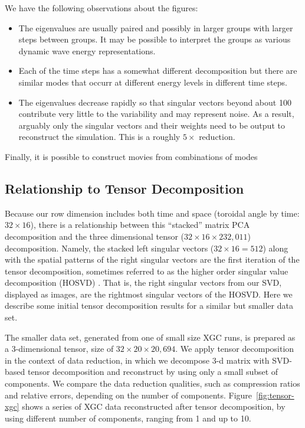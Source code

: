 We have the following observations about the figures:
\begin{itemize}
\item The eigenvalues are usually paired and possibly in larger groups
  with larger steps between groups. It may be possible to interpret
  the groups as various dynamic wave energy representations.
\item Each of the time steps has a somewhat different decomposition
  but there are similar modes that occurr at different energy levels in
  different time steps.
\item The eigenvalues decrease rapidly so that singular vectors beyond
  about 100 contribute very little to the variability and may
  represent noise. As a result, arguably only the singular vectors and
  their weights need to be output to reconstruct the simulation. This
  is a roughly $5\times$ reduction.
\end{itemize}
Finally, it is possible to construct movies from combinations of modes 

\subsection{Relationship to Tensor Decomposition}
Because our row dimension includes both time and space (toroidal angle
by time: $32\times 16$), there is a relationship between this
``stacked'' matrix PCA decomposition and the three dimensional tensor
($32\times 16\times 232,011$) decomposition. Namely, the stacked left
singular vectors ($32\times 16 = 512$) along with the spatial patterns
of the right singular vectors are the first iteration of the tensor
decomposition, sometimes referred to as the higher order singular
value decomposition (HOSVD) \cite[p.1264]{DeLathauwer2000}. That is,
the right singular vectors from our SVD, displayed as images, are the
rightmost singular 
vectors of the HOSVD. Here we describe some initial tensor
decomposition results for a similar but smaller data set.

The smaller data set, generated from one of small size XGC runs, is prepared as a 3-dimensional tensor, size of  $32\times20\times20,694$. We apply tensor decomposition in the context of data reduction, in which we decompose 3-d matrix with SVD-based tensor decomposition and reconstruct by using only a small subset of components. We compare the data reduction qualities, such as compression ratios and relative errors, depending on the number of components. Figure~\ref{fig:tensor-xgc} shows a series of XGC data reconstructed after tensor decomposition, by using different number of components, ranging from 1 and up to 10.

